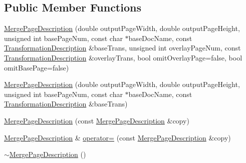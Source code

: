 \subsection*{Public Member Functions}
\begin{DoxyCompactItemize}
\item 
\hyperlink{structmerge__lib_1_1_merge_page_description_a13b51b6c5809ddc15b62d401407b8df9}{Merge\-Page\-Description} (double output\-Page\-Width, double output\-Page\-Height, unsigned int base\-Page\-Num, const char $\ast$base\-Doc\-Name, const \hyperlink{classmerge__lib_1_1_transformation_description}{Transformation\-Description} \&base\-Trans, unsigned int overlay\-Page\-Num, const \hyperlink{classmerge__lib_1_1_transformation_description}{Transformation\-Description} \&overlay\-Trans, bool omit\-Overlay\-Page=false, bool omit\-Base\-Page=false)
\item 
\hyperlink{structmerge__lib_1_1_merge_page_description_ae1333964e9ce3c88b49ec8a624d9d44c}{Merge\-Page\-Description} (double output\-Page\-Width, double output\-Page\-Height, unsigned int base\-Page\-Num, const char $\ast$base\-Doc\-Name, const \hyperlink{classmerge__lib_1_1_transformation_description}{Transformation\-Description} \&base\-Trans)
\item 
\hyperlink{structmerge__lib_1_1_merge_page_description_ac4de84c3af7f904c92361019a11d1d81}{Merge\-Page\-Description} (const \hyperlink{structmerge__lib_1_1_merge_page_description}{Merge\-Page\-Description} \&copy)
\item 
\hyperlink{structmerge__lib_1_1_merge_page_description}{Merge\-Page\-Description} \& \hyperlink{structmerge__lib_1_1_merge_page_description_a2cb7dd7304f5979ccf4d78ae0012ffdf}{operator=} (const \hyperlink{structmerge__lib_1_1_merge_page_description}{Merge\-Page\-Description} \&copy)
\item 
\hyperlink{structmerge__lib_1_1_merge_page_description_af1aa6a4484a1fa426178372e7f9db809}{$\sim$\-Merge\-Page\-Description} ()
\end{DoxyCompactItemize}
